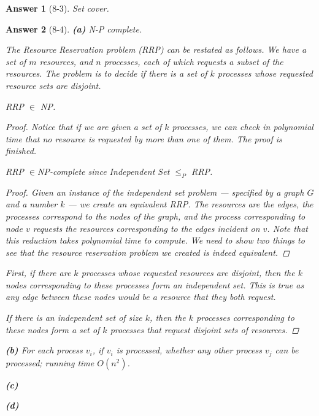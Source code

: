 \documentclass[11pt]{article}
\theoremstyle{numberplain}
\theoremstyle{nonumberplain}
\newtheorem{proof}{Proof}
\newtheorem{ans}{Answer}
\newcommand{\0}{{\mathbf{0}}}
\begin{document}
\begin{ans}[8-3] Set cover.
\end{ans}
\begin{ans}[8-4] \textbf{(a)} N-P complete. \par 
The {\sc Resource Reservation} problem (RRP) can be restated as follows. 
We have a set of $m$ resources, and $n$ processes, each of which
requests a subset of the resources. The problem is to decide if there
is a set of $k$ processes whose requested resource sets are disjoint.
\par 

\begin{State}[Claim 1]
RRP $\in$ NP.
\end{State}
\begin{proof}Notice that if we are given a set of $k$ processes,
we can check in polynomial time that no resource is
requested by more than one of them. The proof is finished.

\begin{State}[Claim 2]
RRP $\in$NP-complete since {\sc Independent Set} $\le_P$ {\sc RRP}.
\end{State}
\begin{proof}
Given an instance of the independent set problem --- specified by
a graph $G$ and a number $k$ ---
we create an equivalent RRP. The resources are the edges, the processes 
correspond to the nodes of the graph, and the process corresponding 
to node $v$ requests the resources corresponding to the edges 
incident on $v$.  
Note that this reduction takes polynomial time to compute.
We need to show
two things to see that the resource reservation problem we created is indeed
equivalent.
\end{proof}
\par 
First, if there are $k$ processes whose requested resources are disjoint, then 
the $k$ nodes corresponding to these processes form an independent set. This
is true as any edge between these nodes would be a resource that they both
request.

\par 
If there is an independent set of size $k$, then the $k$ processes 
corresponding to these nodes form a set of $k$ processes that request disjoint 
sets of resources.
\end{proof}
\par
\textbf{(b)} For each process $v_i$, if $v_i$ is processed, whether any other process $v_j$ can be processed; running time $O(n^2)$.
\par 
\textbf{(c)}
\par 
\textbf{(d)}
\end{ans}
\end{document}
